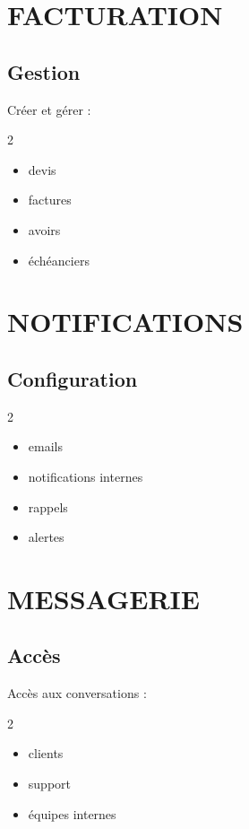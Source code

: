 \documentclass[12pt,a4paper,oneside]{book}
\begin{document}
\chapter{FACTURATION}

\section{Gestion}
Créer et gérer :
\begin{multicols}{2}
\begin{itemize}
\item devis
\item factures
\item avoirs
\item échéanciers
\end{itemize}
\end{multicols}

\chapter{NOTIFICATIONS}

\section{Configuration}
\begin{multicols}{2}
\begin{itemize}
\item emails
\item notifications internes
\item rappels
\item alertes
\end{itemize}
\end{multicols}

\chapter{MESSAGERIE}

\section{Accès}
Accès aux conversations :
\begin{multicols}{2}
\begin{itemize}
\item clients
\item support
\item équipes internes
\end{itemize}
\end{multicols}
\end{document}

